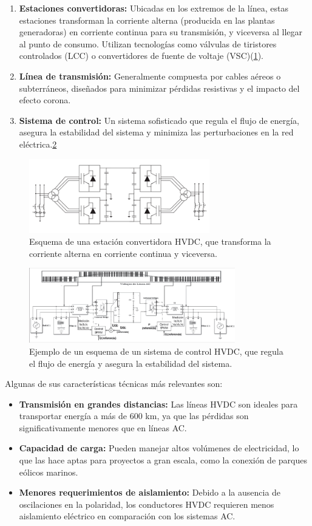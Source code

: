 \begin{enumerate}
    \item \textbf{Estaciones convertidoras:} Ubicadas en los extremos de la línea, estas estaciones transforman la corriente alterna (producida en las plantas generadoras) en corriente continua para su transmisión, y viceversa al llegar al punto de consumo. Utilizan tecnologías como válvulas de tiristores controlados (LCC) o convertidores de fuente de voltaje (VSC)(\ref{fig:figure_2}).
    \item \textbf{Línea de transmisión:} Generalmente compuesta por cables aéreos o subterráneos, diseñados para minimizar pérdidas resistivas y el impacto del efecto corona.
    \item \textbf{Sistema de control:} Un sistema sofisticado que regula el flujo de energía, asegura la estabilidad del sistema y minimiza las perturbaciones en la red eléctrica.\ref{fig:figure_3}
\end{enumerate}
\begin{figure}
	\centering
	\includegraphics[width=0.7\textwidth]{img/ejemplos/Figure_2}
	\caption{Esquema de una estación convertidora HVDC, que transforma la corriente alterna en corriente continua y viceversa.}
	\label{fig:figure_2}
\end{figure}
\begin{figure}
	\centering
	\includegraphics[width=0.8\textwidth]{img/ejemplos/Figure_3}
	\caption{Ejemplo de un esquema de un sistema de control HVDC, que regula el flujo de energía y asegura la estabilidad del sistema.}
	\label{fig:figure_3}
\end{figure}
Algunas de sus características técnicas más relevantes son:
\begin{itemize}
    \item \textbf{Transmisión en grandes distancias:} Las líneas HVDC son ideales para transportar energía a más de 600 km, ya que las pérdidas son significativamente menores que en líneas AC.
    \item \textbf{Capacidad de carga:} Pueden manejar altos volúmenes de electricidad, lo que las hace aptas para proyectos a gran escala, como la conexión de parques eólicos marinos.
    \item \textbf{Menores requerimientos de aislamiento:} Debido a la ausencia de oscilaciones en la polaridad, los conductores HVDC requieren menos aislamiento eléctrico en comparación con los sistemas AC.
\end{itemize}

